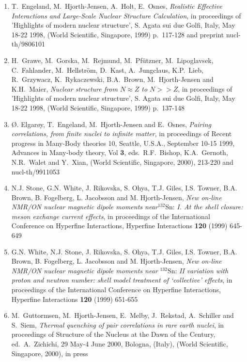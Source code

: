 \begin{enumerate}
\item 
     T.\ Engeland, M.\ Hjorth-Jensen, A.\ Holt, E.\ Osnes,
    {\em Realistic Effective Interactions and Large-Scale Nuclear Structure Calculation}, in proceedings of 'Highlights
of modern nuclear structure', S. Agata sui due Golfi, Italy, May 
 18-22 1998,
    (World Scientific, Singapore, 1999) p.\ 117-128 and 
    preprint nucl-th/9806101 
\item 
     H.\ Grawe, M.\ Gorska, M.\ Rejmund, M.\ Pf\"utzner, M.\ Lipoglavsek,
     C.\ Fahlander, M.\ Hellstr\"om, D.\ Kast, A.\ Jungclaus, K.P.\ Lieb,
     R.\ Grzywacz, K.\ Rykaczewski, B.A.\ Brown,
    M.\ Hjorth-Jensen and K.H.\ Maier,
    {\em Nuclear structure from $N\approx Z$ to $N >>Z$}, in proceedings of 'Highlights
of modern nuclear structure', S. Agata sui due Golfi, Italy, May 
 18-22 1998,
    (World Scientific, Singapore, 1999) p.\ 137-148
\item
    \O. Elgar\o y, T.\ Engeland, M.\ Hjorth-Jensen and E.\ Osnes,
    {\em Pairing correlations, from finite nuclei to infinite matter},
    in proceedings of Recent progress in Many-Body theories 10, Seattle, U.S.A.,
    September 10-15 1999, Advances in Many-body theory, Vol {\bf 3}, 
    eds.~R.F.~Bishop, K.A.\ Gernoth, N.R.\ Walet and Y.\ Xian,  
    (World Scientific, Singapore, 2000), 213-220 and
    nucl-th/9911053
\item N.J. Stone,  G.N. White,  J. Rikovska,  S. Ohya,  T.J. Giles,  I.S. Towner,  B.A. Brown,  B. Fogelberg,  L. Jacobsson and  M. Hjorth-Jensen,
{\em New on-line NMR/ON nuclear magnetic dipole moments near}$^{132}$Sn: {\em I. At the shell closure: meson exchange current effects}, 
in proceedings of the International Conference on Hyperfine Interactions,
Hyperfine Interactions
{\bf 120} (1999) 645-649
\item
    G.N. White,  N.J. Stone,  J. Rikovska,  S. Ohya,  T.J. Giles,  I.S. Towner,  B.A. Brown,  B. Fogelberg,  L. Jacobsson and  M. Hjorth-Jensen,
  {\em New on-line NMR/ON nuclear magnetic dipole moments near} $^{132}$Sn: {\em II variation with proton and neutron number: shell model treatment of `collective' effects}, 
in proceedings of the International Conference on Hyperfine Interactions,
Hyperfine Interactions {\bf 120} (1999) 651-655
\item  M.\ Guttormsen, M.\ Hjorth-Jensen, E.\ Melby,  
       J.\ Rekstad,  A.\ Schiller and S.\ Siem,
       {\em Thermal quenching of pair correlations in rare earth nuclei},
in proceedings of Structure of the Nucleus at the Dawn of the Century, ed.~A.~Zichichi, 29 May-4 June 2000, Bologna, (Italy), (World Scientific, Singapore, 2000), in press 

\end{enumerate}
